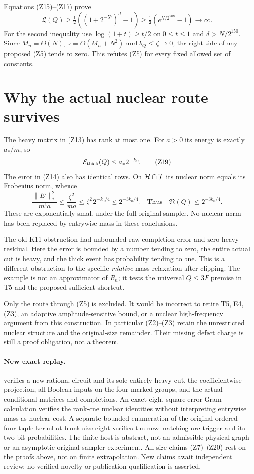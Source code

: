 \documentclass[11pt]{article}
\begin{document}
Equations (Z15)--(Z17) prove
\[
 {\mathfrak L}(Q)
 \ge\tfrac12((1+2^{-57})^d-1)
 \ge\tfrac12(e^{N/2^{208}}-1)\longrightarrow\infty .
                                                               \tag{Z18}
\]
For the second inequality use
$\log(1+t)\ge t/2$ on $0\le t\le1$ and $d>N/2^{150}$.
Since $M_n=\Theta(N)$, $s=O(M_n+N^2)$ and $b_Q\le\zeta\to0$,
the right side of any proposed (Z5) tends to zero.
This refutes (Z5) for every fixed allowed set of constants.

\section{Why the actual nuclear route survives}
The heavy matrix in (Z13) has rank at most one. For $a>0$ its
energy is exactly $a_*/m$, so
\[
             {\cal E}_{\rm thick}(Q)\le a_*2^{-k_0}.      \tag{Z19}
\]
The error in (Z14) also has identical rows.
On ${\cal H}\cap{\cal T}$ its nuclear norm equals its
Frobenius norm, whence
\[
 \frac{\|E'\|_*^2}{m^3a}
 \le\frac{\zeta^2}{ma}
 \le\zeta^2\,2^{-k_0/4}
 \le2^{-3k_0/4}.
 \quad\text{Thus}\quad
                       {\mathfrak N}(Q)\le2^{-3k_0/4}.   \tag{Z20}
\]
These are exponentially small under the full original sampler.
No nuclear norm has been replaced by entrywise mass in these
conclusions.

The old K11 obstruction had unbounded raw completion error and
zero heavy residual. Here the error is bounded by a number tending
to zero, the entire actual cut is heavy, and the thick event has
probability tending to one. This is a different obstruction to the
specific \emph{relative} mass relaxation after clipping.
The example is not an approximator of $R_n$; it tests the universal
$Q\le3F$ premise in T5 and the proposed sufficient shortcut.

Only the route through (Z5) is excluded. It would be incorrect to
retire T5, E4, (Z3), an adaptive amplitude-sensitive bound, or a
nuclear high-frequency argument from this construction.
In particular (Z2)--(Z3) retain the unrestricted nuclear structure
and the original-size remainder. Their missing defect charge is
still a proof obligation, not a theorem.

\paragraph{New exact replay.}
 verifies a new rational circuit and
its sole entirely heavy cut, the coefficientwise projection,
all Boolean inputs on the four marked groups, and the actual
conditional matrices and completions.
An exact eight-square error Gram calculation verifies the rank-one
nuclear identities without interpreting entrywise mass as nuclear
cost. A separate bounded enumeration of the original ordered
four-tuple kernel at block size eight verifies the new matching-arc
trigger and its two bit probabilities.
The finite host is abstract, not an admissible physical graph or
an asymptotic original-sampler experiment.
All-size claims (Z7)--(Z20) rest on the proofs above, not on finite
extrapolation. New claims await independent review; no verified
novelty or publication qualification is asserted.
\end{document}
